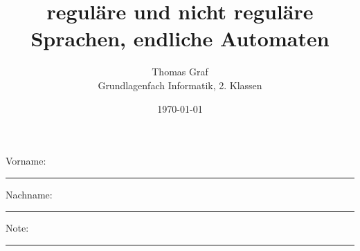 \newtoggle{withbonus} \toggletrue{withbonus} %

\newcommand{\mycourse}{Grundlagenfach Informatik}
\newcommand{\myclass}{2. Klassen}
\newcommand{\mydate}{\today}

\title{\textbf{reguläre und nicht reguläre Sprachen, endliche Automaten}}
\author{Thomas Graf\\
	\mycourse, \myclass}
\date{\mydate}
\maketitle
\thispagestyle{headandfoot}

\begin{center}
\end{center}
\vspace{10mm}

\begin{center}
	Vorname: \rule{45mm}{0.8pt}\qquad Nachname: \rule{45mm}{0.8pt}
\end{center}
\vspace{20mm}

\begin{center}
	\iftoggle{withbonus} {
		\combinedgradetable[h][questions]
	} {
		\gradetable[h][questions]
	}
\end{center}
\vspace{15mm}
\begin{center}
	Note:
	\vspace{10mm}

	\rule{8mm}{1.2pt}
\end{center}
\clearpage


